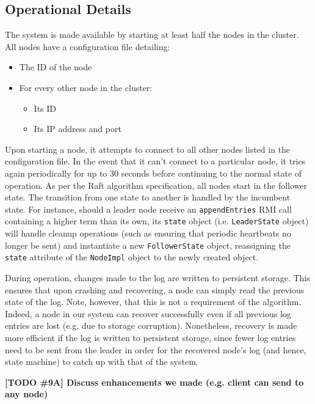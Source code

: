 \documentclass[12pt, a4paper]{article}
\newcommand{\todo}[2]{\textbf{\color{blue}[TODO \##1] #2}\par}
\begin{document}
\subsection{Operational Details}
The system is made available by starting at least half the nodes in the cluster. All nodes have a configuration file detailing:
\begin{itemize}
    \item The ID of the node
    \item For every other node in the cluster:
    \begin{itemize}
        \item Its ID
        \item Its IP address and port
    \end{itemize}
\end{itemize}
Upon starting a node, it attempts to connect to all other nodes listed in the configuration file. In the event that it can't connect to a particular node, it tries again periodically for up to 30 seconds before continuing to the normal state of operation. As per the Raft algorithm specification, all nodes start in the follower state. The transition from one state to another is handled by the incumbent state. For instance, should a leader node receive an \texttt{appendEntries} RMI call containing a higher term than its own, its \texttt{state} object (i.e. \texttt{LeaderState} object) will handle cleanup operations (such as ensuring that periodic heartbeats no longer be sent) and instantiate a new \texttt{FollowerState} object, reassigning the \texttt{state} attribute of the \texttt{NodeImpl} object to the newly created object.

During operation, changes made to the log are written to persistent storage. This ensures that upon crashing and recovering, a node can simply read the previous state of the log. Note, however, that this is not a requirement of the algorithm. Indeed, a node in our system can recover successfully even if all previous log entries are lost (e.g. due to storage corruption). Nonetheless, recovery is made more efficient if the log is written to persistent storage, since fewer log entries need to be sent from the leader in order for the recovered node's log (and hence, state machine) to catch up with that of the system.

\todo{9A}{Discuss enhancements we made (e.g. client can send to any node)}

\end{document}
